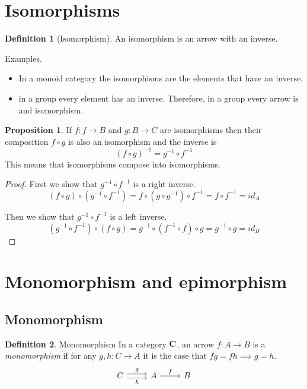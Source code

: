 \documentclass{book}
\theoremstyle{definition}
\newtheorem{definition}{Definition}[section]
\newtheorem{proposition}{Proposition}
\begin{document}
\section{Isomorphisms}

\begin{definition}[Isomorphism]
  An isomorphism is an arrow with an inverse.
\end{definition}

Examples.
\begin{itemize}
  \item In a monoid category the isomorphisms are the elements that have an inverse.
  \item in a group every element has an inverse. Therefore, in a group every
    arrow is and isomorphism.
\end{itemize}

\begin{proposition}
  If $f : f \to B$ and $g : B \to C$ are isomorphisms then their composition
  $f \circ g$ is also an isomorphism and the inverse is
  \[
    (f \circ g)^{-1} = g^{-1} \circ f^{-1}
  \]
  This means that isomorphisms compose into isomorphisms.
\end{proposition}
\begin{proof}
  First we show that $g^{-1} \circ f^{-1}$ is a right inverse.
  \[ (f \circ g) \circ (g^{-1} \circ f^{-1}) = f \circ (g \circ g^{-1}) \circ
    f^{-1} = f \circ f^{-1} = id_A \]

  Then we show that $g^{-1} \circ f^{-1}$ is a left inverse.
  \[ (g^{-1} \circ f^{-1}) \circ (f \circ g) = g^{-1} \circ (f^{-1} \circ f)
    \circ g = g^{-1} \circ g = id_B\]
\end{proof}

\section{Monomorphism and epimorphism}

\subsection{Monomorphism}

\begin{definition}{Monomorphism}
  In a category $\bf{C}$, an arrow $f : A \to B$ is a \emph{monomorphism} if for
  any $g, h : C \rightarrow A$ it is the case that $fg = fh \implies g = h$.
  \[
  \begin{tikzcd}
    C \ar[r, shift left, "g"] \ar[r, shift right, "h"'] & A \arrow[r, "f"] & B
  \end{tikzcd}
  \]
\end{definition}
\end{document}
